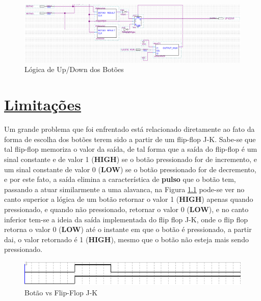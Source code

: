 \documentclass[14pt, oneside]{book}
\newcommand\tab[1][1cm]{\hspace*{#1}}
\theoremstyle{definition}
\begin{document}
                \begin{figure}[!h]
                    \centering
                    \includegraphics[scale=0.5]{botoes.png}
                    \caption{Lógica de Up/Down dos Botões}
                    \label{fig:botoes}
                \end{figure}
            
         \chapter[Limitações]{\hyperlink{toc}{Limitações}}
            \tab Um grande problema que foi enfrentado está relacionado diretamente ao fato da forma de escolha dos botões terem sido a partir de um flip-flop J-K. Sabe-se que tal flip-flop memoriza o valor da saída, de tal forma que a saída do flip-flop é um sinal constante e de valor 1 (\textbf{HIGH}) se o botão pressionado for de incremento, e um sinal constante de valor 0 (\textbf{LOW}) se o botão pressionado for de decremento, e por este fato, a saída elimina a característica de \textbf{pulso} que o botão tem, passando a atuar similarmente a uma alavanca, na Figura \ref{fig:segura} pode-se ver no canto superior a lógica de um botão retornar o valor 1 (\textbf{HIGH}) apenas quando pressionado, e quando não pressionado, retornar o valor 0 (\textbf{LOW}), e no canto inferior tem-se a ideia da saída implementada do flip flop J-K, onde o flip flop retorna o valor 0 (\textbf{LOW}) até o instante em que o botão é pressionado, a partir dai, o valor retornado é 1 (\textbf{HIGH}), mesmo que o botão não esteja mais sendo pressionado. \\
            \begin{figure}[!h]
                    \centering
                    \includegraphics[scale=1.3]{segura.png}
                    \caption{Botão vs Flip-Flop J-K}
                    \label{fig:segura}
                \end{figure} \\
\end{document}
